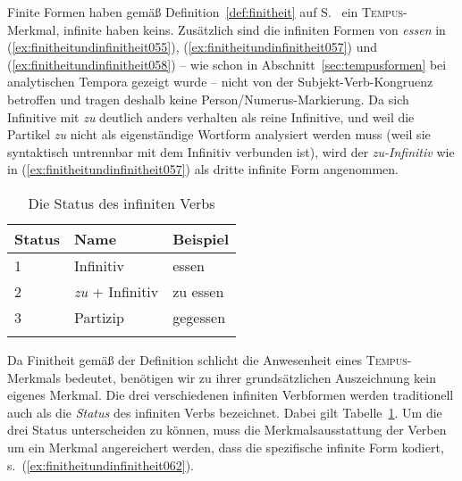 \begin{exe}
  \ex\label{ex:finitheitundinfinitheit054}
  \begin{xlist}
  \end{xlist}
  \ex\label{ex:finitheitundinfinitheit058}
  \begin{xlist}
  \end{xlist}
\end{exe}

Finite Formen haben gemäß Definition~\ref{def:finitheit} auf S.~\pageref{def:finitheit} ein \textsc{Tempus}-Merkmal, infinite haben keins.
Zusätzlich sind die infiniten Formen von \textit{essen} in (\ref{ex:finitheitundinfinitheit055}), (\ref{ex:finitheitundinfinitheit057}) und (\ref{ex:finitheitundinfinitheit058}) -- wie schon in Abschnitt~\ref{sec:tempusformen} bei analytischen Tempora gezeigt wurde -- nicht von der Subjekt-Verb-Kongruenz betroffen und tragen deshalb keine Person\slash Numerus-Markierung.
Da sich Infinitive mit \textit{zu} deutlich anders verhalten als reine Infinitive, und weil die Partikel \textit{zu} nicht als eigenständige Wortform analysiert werden muss (weil sie syntaktisch untrennbar mit dem Infinitiv verbunden ist), wird der \textit{zu-Infinitiv} wie in (\ref{ex:finitheitundinfinitheit057}) als dritte infinite Form angenommen.

\begin{table}[!htbp]
  \centering
  \begin{tabular}{lll}
    \lsptoprule
    \textbf{Status} & \textbf{Name} & \textbf{Beispiel} \\
    \midrule
    1 & Infinitiv & essen \\
    2 & \textit{zu} + Infinitiv & zu essen \\
    3 & Partizip & gegessen \\
    \lspbottomrule
  \end{tabular}
  \caption{Die Status des infiniten Verbs}
  \label{tab:finitheitundinfinitheit061}
\end{table}

Da Finitheit gemäß der Definition schlicht die Anwesenheit eines \textsc{Tempus}-\-Merk\-mals bedeutet, benötigen wir zu ihrer grundsätzlichen Auszeichnung kein eigenes Merkmal.
Die drei verschiedenen infiniten Verbformen werden traditionell auch als die \textit{Status} des infiniten Verbs bezeichnet.
Dabei gilt Tabelle~\ref{tab:finitheitundinfinitheit061}.
Um die drei Status unterscheiden zu können, muss die Merkmalsausstattung der Verben um ein Merkmal angereichert werden, dass die spezifische infinite Form kodiert, s.\ (\ref{ex:finitheitundinfinitheit062}).

